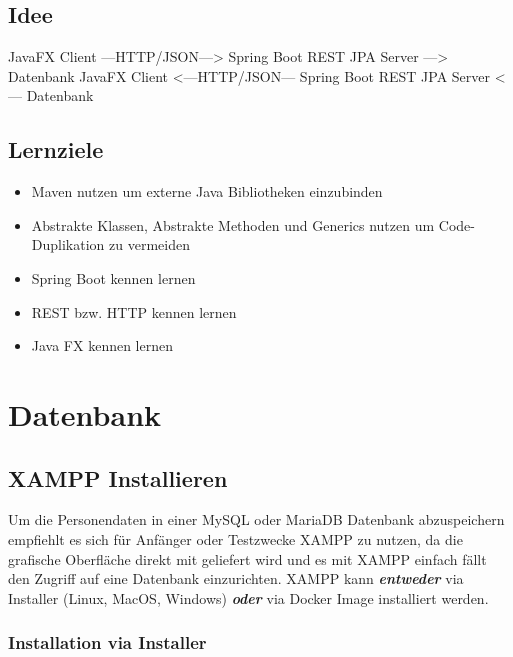\documentclass[11pt]{scrartcl}
\begin{document}
\subsection{Idee}
\label{sec:idee}
JavaFX Client ---HTTP/JSON---> Spring Boot REST JPA Server ---> Datenbank \newline
JavaFX Client <---HTTP/JSON--- Spring Boot REST JPA Server <--- Datenbank

\subsection{Lernziele}
\label{sec:learninggoals}
\begin{itemize}
    \item Maven nutzen um externe Java Bibliotheken einzubinden
    \item Abstrakte Klassen, Abstrakte Methoden und Generics nutzen um Code-Duplikation zu vermeiden
    \item Spring Boot kennen lernen
    \item REST bzw. HTTP kennen lernen
    \item Java FX kennen lernen
\end{itemize}

\newpage
\section{Datenbank}
\label{sec:datenbank}

\subsection{XAMPP Installieren}
\label{sec:xamppinstallieren}
Um die Personendaten in einer MySQL oder MariaDB Datenbank abzuspeichern
empfiehlt es sich für Anfänger oder Testzwecke XAMPP zu nutzen, da die
grafische Oberfläche direkt mit
geliefert wird und es mit XAMPP einfach fällt den Zugriff auf eine Datenbank
einzurichten.\newline
XAMPP kann \textit{\textbf{entweder}} via Installer (Linux, MacOS, Windows) \textit{\textbf{oder}} via Docker Image
installiert werden.

\subsubsection{Installation via Installer}
\label{sec:installviainstaller}
\end{document}
